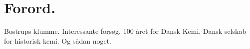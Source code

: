 \chapter{Forord.}

Bostrups klumme. Interessante forsøg. 100 året for Dansk Kemi. Dansk selskab for historisk kemi.
 Og sådan noget.
